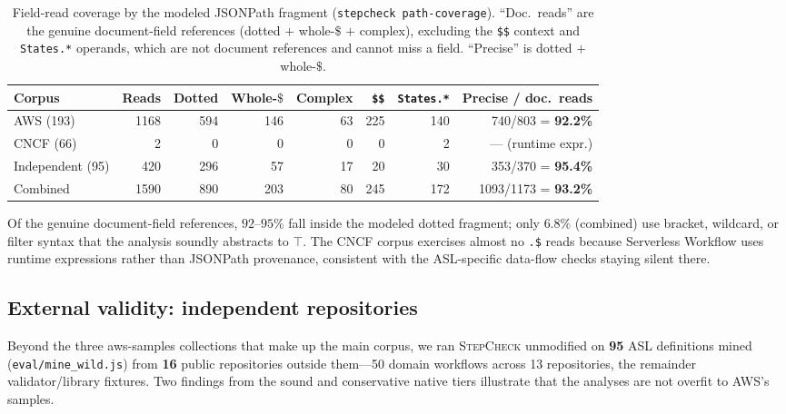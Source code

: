 \documentclass[11pt]{article}
\newcommand{\tool}{\textsc{StepCheck}}
\theoremstyle{plain}
\theoremstyle{definition}
\theoremstyle{remark}
\begin{document}
\begin{table}[t]
\centering\small
\setlength{\tabcolsep}{5pt}
\caption{Field-read coverage by the modeled JSONPath fragment (\texttt{stepcheck path-coverage}).
``Doc.\ reads'' are the genuine document-field references (dotted $+$ whole-$\$$ $+$ complex),
excluding the \texttt{\$\$} context and \texttt{States.*} operands, which are not document
references and cannot miss a field. ``Precise'' is dotted $+$ whole-$\$$.}
\label{tab:tr:coverage}
\begin{tabular}{@{}lrrrrrrr@{}}
\toprule
Corpus & Reads & Dotted & Whole-$\$$ & Complex & \texttt{\$\$} & \texttt{States.*} & Precise / doc.\ reads \\
\midrule
AWS (193)        & 1168 & 594 & 146 & 63 & 225 & 140 & 740/803 = \textbf{92.2\%} \\
CNCF (66)        &    2 &   0 &   0 &  0 &   0 &   2 & --- (runtime expr.) \\
Independent (95) &  420 & 296 &  57 & 17 &  20 &  30 & 353/370 = \textbf{95.4\%} \\
\midrule
Combined         & 1590 & 890 & 203 & 80 & 245 & 172 & 1093/1173 = \textbf{93.2\%} \\
\bottomrule
\end{tabular}
\end{table}

Of the genuine document-field references, $92$--$95\%$ fall inside the modeled dotted fragment;
only $6.8\%$ (combined) use bracket, wildcard, or filter syntax that the analysis soundly abstracts
to $\top$. The CNCF corpus exercises almost no \texttt{.\$} reads because Serverless Workflow uses
runtime expressions rather than JSONPath provenance, consistent with the ASL-specific data-flow
checks staying silent there.

\subsection{External validity: independent repositories}
\label{sec:tr:external}

Beyond the three aws-samples collections that make up the main corpus, we ran \tool{} unmodified on
\textbf{95} ASL definitions mined (\texttt{eval/mine\_wild.js}) from \textbf{16} public repositories
outside them---50 domain workflows across 13 repositories, the remainder validator/library
fixtures. Two findings from the sound and conservative native tiers illustrate that the analyses are
not overfit to AWS's samples.
\end{document}
